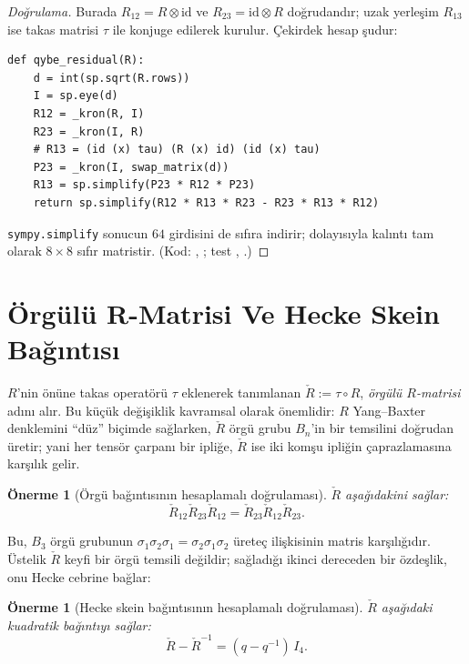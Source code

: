 \documentclass[12pt,a4paper,fleqn]{report}
\newcommand{\normalsemi}{;}
\newcommand{\normalsemi}{\begingroup\semicolonfont;\endgroup}
\numberwithin{equation}{chapter}
\theoremstyle{plain}
\newtheorem{proposition}[theorem]{Önerme}
\theoremstyle{definition}
\newcommand{\id}{\mathrm{id}}
\begin{document}
\begin{proof}[Doğrulama]
Burada $R_{12}=R\otimes\id$ ve $R_{23}=\id\otimes R$ doğrudandır\normalsemi{} uzak yerleşim
$R_{13}$ ise takas matrisi $\tau$ ile konjuge edilerek kurulur. Çekirdek
hesap şudur:
\begin{lstlisting}[style=pyblock,caption={QYBE Kalıntısı Ve $R_{13}$'un Takasla İnşası}]
def qybe_residual(R):
    d = int(sp.sqrt(R.rows))
    I = sp.eye(d)
    R12 = _kron(R, I)
    R23 = _kron(I, R)
    # R13 = (id (x) tau) (R (x) id) (id (x) tau)
    P23 = _kron(I, swap_matrix(d))
    R13 = sp.simplify(P23 * R12 * P23)
    return sp.simplify(R12 * R13 * R23 - R23 * R13 * R12)
\end{lstlisting}
\texttt{sympy.simplify} sonucun $64$ girdisini de sıfıra indirir\normalsemi{} dolayısıyla
kalıntı tam olarak $8\times 8$ sıfır matristir. (Kod: ,
\normalsemi{} test , .)
\end{proof}

\section{Örgülü R-Matrisi Ve Hecke Skein Bağıntısı}

$R$'nin önüne takas operatörü $\tau$ eklenerek tanımlanan
$\check R := \tau \circ R$, \emph{örgülü $R$-matrisi} adını alır. Bu küçük
değişiklik kavramsal olarak önemlidir: $R$ Yang--Baxter denklemini ``düz''
biçimde sağlarken, $\check R$ örgü grubu $B_n$'in bir temsilini doğrudan üretir\normalsemi{}
yani her tensör çarpanı bir ipliğe, $\check R$ ise iki komşu ipliğin
çaprazlamasına karşılık gelir.

\begin{proposition}[Örgü bağıntısının hesaplamalı doğrulaması]\label{thm:braid}
$\check R$ aşağıdakini sağlar:
\begin{equation}
  \check R_{12} \check R_{23} \check R_{12} = \check R_{23} \check R_{12} \check R_{23}.
\end{equation}
\end{proposition}

Bu, $B_3$ örgü grubunun $\sigma_1\sigma_2\sigma_1 = \sigma_2\sigma_1\sigma_2$
üreteç ilişkisinin matris karşılığıdır. Üstelik $\check R$ keyfi bir örgü
temsili değildir\normalsemi{} sağladığı ikinci dereceden bir özdeşlik, onu Hecke cebrine
bağlar:

\begin{proposition}[Hecke skein bağıntısının hesaplamalı doğrulaması]\label{thm:hecke}
$\check R$ aşağıdaki kuadratik bağıntıyı sağlar:
\begin{equation}
  \check R - \check R^{-1} = (q - q^{-1})\, I_4.
\end{equation}
\end{proposition}
\end{document}
